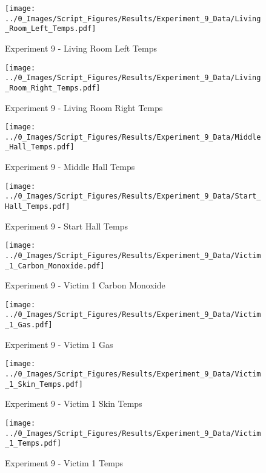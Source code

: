 	\clearpage

	\begin{figure}[H]
		\centering
		\texttt{[image: ../0\_Images/Script\_Figures/Results/Experiment\_9\_Data/Living\_Room\_Left\_Temps.pdf]}
		\caption[]{Experiment 9 - Living Room Left Temps}
	\end{figure}
 

	\begin{figure}[H]
		\centering
		\texttt{[image: ../0\_Images/Script\_Figures/Results/Experiment\_9\_Data/Living\_Room\_Right\_Temps.pdf]}
		\caption[]{Experiment 9 - Living Room Right Temps}
	\end{figure}
 
	\clearpage

	\begin{figure}[H]
		\centering
		\texttt{[image: ../0\_Images/Script\_Figures/Results/Experiment\_9\_Data/Middle\_Hall\_Temps.pdf]}
		\caption[]{Experiment 9 - Middle Hall Temps}
	\end{figure}
 

	\begin{figure}[H]
		\centering
		\texttt{[image: ../0\_Images/Script\_Figures/Results/Experiment\_9\_Data/Start\_Hall\_Temps.pdf]}
		\caption[]{Experiment 9 - Start Hall Temps}
	\end{figure}
 
	\clearpage

	\begin{figure}[H]
		\centering
		\texttt{[image: ../0\_Images/Script\_Figures/Results/Experiment\_9\_Data/Victim\_1\_Carbon\_Monoxide.pdf]}
		\caption[]{Experiment 9 - Victim 1 Carbon Monoxide}
	\end{figure}
 

	\begin{figure}[H]
		\centering
		\texttt{[image: ../0\_Images/Script\_Figures/Results/Experiment\_9\_Data/Victim\_1\_Gas.pdf]}
		\caption[]{Experiment 9 - Victim 1 Gas}
	\end{figure}
 
	\clearpage

	\begin{figure}[H]
		\centering
		\texttt{[image: ../0\_Images/Script\_Figures/Results/Experiment\_9\_Data/Victim\_1\_Skin\_Temps.pdf]}
		\caption[]{Experiment 9 - Victim 1 Skin Temps}
	\end{figure}
 

	\begin{figure}[H]
		\centering
		\texttt{[image: ../0\_Images/Script\_Figures/Results/Experiment\_9\_Data/Victim\_1\_Temps.pdf]}
		\caption[]{Experiment 9 - Victim 1 Temps}
	\end{figure}
 

